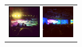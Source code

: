 \documentclass{acm_proc_article-sp}
\newcommand{\thumbheight}{14mm}
\newenvironment{thumbsequence}{}{\makebox[4mm]{}}
\begin{document}
\begin{figure}
\begin{tabular}{p{\textwidth}}
\begin{thumbsequence}
		\includegraphics[height=\thumbheight]{resources/ces/looseduplicate8.jpg}
		\includegraphics[height=\thumbheight]{resources/ces/looseduplicate9.jpg}
	\end{thumbsequence}
\end{tabular}


\end{figure}
\end{document}

